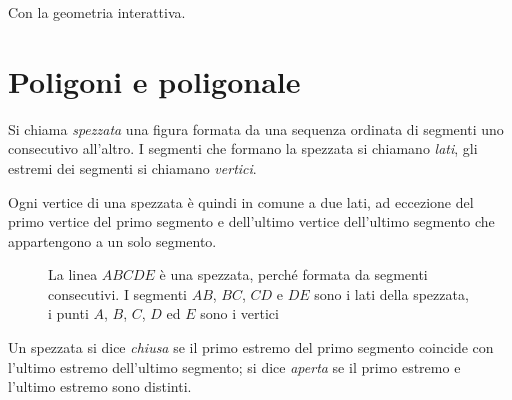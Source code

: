 Con la geometria interattiva.




% 




\section{Poligoni e poligonale}
\label{sect:poligoni}

\begin{definizione}
Si chiama \emph{spezzata} una figura formata da una sequenza ordinata 
di segmenti uno consecutivo all'altro. I segmenti che formano la 
spezzata si chiamano \emph{lati}, gli estremi dei segmenti si 
chiamano \emph{vertici}.
\end{definizione}

Ogni vertice di una spezzata è quindi in comune a due lati, ad 
eccezione del primo vertice del primo segmento e dell'ultimo vertice 
dell'ultimo segmento che appartengono a un solo segmento.


\begin{inaccessibleblock}
 \begin{figure}[htb]
\centering
\caption{La linea $ABCDE$ è una spezzata, perché formata da segmenti 
consecutivi. I segmenti $AB$, $BC$, $CD$ e $DE$ sono i lati della 
spezzata, i punti $A$, $B$, $C$, $D$ ed $E$ sono i vertici}
\end{figure}
\end{inaccessibleblock}

\begin{definizione}
Un spezzata si dice \emph{chiusa} se il primo estremo del primo 
segmento coincide con l'ultimo estremo dell'ultimo segmento; si dice 
\emph{aperta} se il primo estremo e l'ultimo estremo sono distinti.
\end{definizione}

